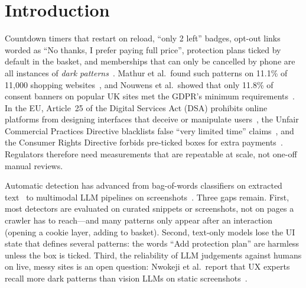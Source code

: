 \documentclass[conference]{IEEEtran}
\begin{document}
\section{Introduction}
Countdown timers that restart on reload, ``only 2 left'' badges, opt-out links worded as ``No thanks,
I prefer paying full price'', protection plans ticked by default in the basket, and memberships that can
only be cancelled by phone are all instances of \emph{dark patterns}~\cite{brignull2010,gray2018}.
Mathur et al.\ found such patterns on 11.1\% of 11{,}000 shopping websites~\cite{mathur2019}, and Nouwens
et al.\ showed that only 11.8\% of consent banners on popular UK sites met the GDPR's minimum
requirements~\cite{nouwens2020}. In the EU, Article~25 of the Digital Services Act (DSA) prohibits online
platforms from designing interfaces that deceive or manipulate users~\cite{dsa2022}, the Unfair Commercial
Practices Directive blacklists false ``very limited time'' claims~\cite{ucpd2005}, and the Consumer
Rights Directive forbids pre-ticked boxes for extra payments~\cite{crd2011}. Regulators therefore need
measurements that are repeatable at scale, not one-off manual reviews.

Automatic detection has advanced from bag-of-words classifiers on extracted text~\cite{yada2022} to
multimodal LLM pipelines on screenshots~\cite{lin2026dpdgpt}. Three gaps remain. First, most detectors are
evaluated on curated snippets or screenshots, not on pages a crawler has to reach---and many patterns only
appear after an interaction (opening a cookie layer, adding to basket). Second, text-only models lose the
UI state that defines several patterns: the words ``Add protection plan'' are harmless unless the box is
ticked. Third, the reliability of LLM judgements against humans on live, messy sites is an open question:
Nwokeji et al.\ report that UX experts recall more dark patterns than vision LLMs on static
screenshots~\cite{nwokeji2026}.
\end{document}
